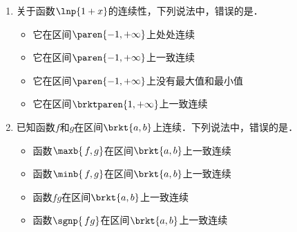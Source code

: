 \documentclass[a4paper,punct=CCT]{ctexbook}
\theoremstyle{definition}
\theoremstyle{remark}
\newif\ifshowsol
\let\leq\leqslant
\let\le\leq
\begin{document}
\begin{enumerate}
  \ifshowsol
  由定理~\ref{thm:hc}可知，前三个选项中的函数是一致连续的．关于选项~D中的函数，令\(1/x = 2\,k\pi\)，当\(k\)足够大时，自然能使\(\abs{x-0}\)小于任意的\(\delta\)，然而\(\abs*{\,f(x) - f(0)} = 1\)．因此它不是一致连续的．实际上，如果修改定义，让此函数在原点处的值为零，同样可由定理~\ref{thm:hc}得到一致连续性．
  \fi

\item 关于函数\(\lnp{1+x}\)的连续性，下列说法中，错误的是\uline{\hspace{10em}}．
  \begin{itemize}
    \renewcommand{\labelitemi}{\faCircleThin}
  \item 它在区间\(\paren{-1,+\infty}\)上处处连续
    \ifshowsol
  \item[\faCircle]
    \else
  \item
    \fi
    它在区间\(\paren{-1,+\infty}\)上一致连续
  \item 它在区间\(\paren{-1,+\infty}\)上没有最大值和最小值
  \item 它在区间\(\brktparen{1,+\infty}\)上一致连续
  \end{itemize}

  \ifshowsol
  取出子区间\(\paren{-1,0}\)，再由定理~\ref{thm:unicontbndintvbnd}可知，选项~B中的函数在此子区间上不是一致连续的，自然在原区间上也不是一致连续的．关于选项~D，对于任意的\(\varepsilon > 0\)，有
  \begin{equation*}
    \lnp{1+x+\fwdf x} - \lnp{1+x} = \lnp[\bigg]{1 + \frac{\fwdf x}{1+x}} \le \frac{\fwdf x}{1+x} \le \frac{\fwdf x}{2} \le \fwdf x,
  \end{equation*}
  取\(\delta = \varepsilon\)，则当\(0 \le \fwdf x < \delta\)时，自然有\(\,f(x+\fwdf x) - f(x) < \delta = \varepsilon\)．因此它在区间\(\brktparen{1,+\infty}\)上是一致连续的．
  \fi

\item 已知函数\(f\)和\(g\)在区间\(\brkt{a,b}\)上连续．下列说法中，错误的是\uline{\hspace{8em}}．
  \begin{itemize}
    \renewcommand{\labelitemi}{\faCircleThin}
  \item 函数\(\maxb{\,f, g}\)在区间\(\brkt{a,b}\)上一致连续
  \item 函数\(\minb{\,f, g}\)在区间\(\brkt{a,b}\)上一致连续
  \item 函数\(fg\)在区间\(\brkt{a,b}\)上一致连续
    \ifshowsol
  \item[\faCircle]
    \else
  \item
    \fi
    函数\(\sgnp{\,fg}\)在区间\(\brkt{a,b}\)上一致连续
  \end{itemize}


\end{enumerate}
\end{document}
